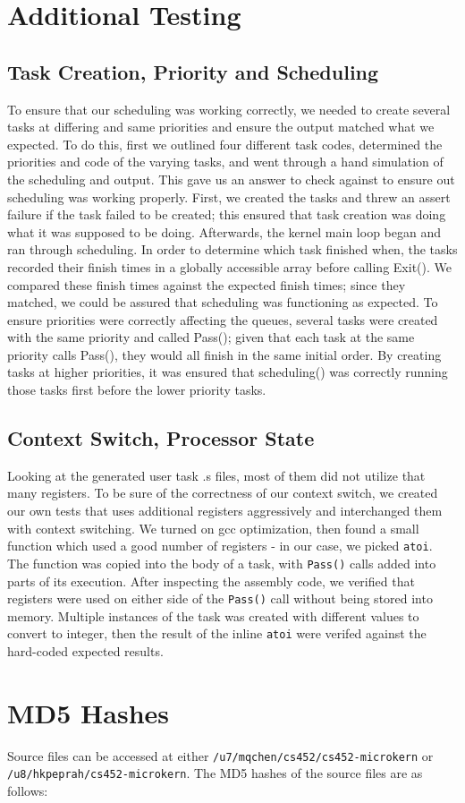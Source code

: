 \documentclass[12pt]{article}
\begin{document}
\section{Additional Testing}
\subsection{Task Creation, Priority and Scheduling}
To ensure that our scheduling was working correctly, we needed to create several tasks at differing and same priorities and ensure the output matched what we expected.  To do this, first we outlined four different task codes, determined the priorities and code of the varying tasks, and went through a hand simulation of the scheduling and output.  This gave us an answer to check against to ensure out scheduling was working properly.  First, we created the tasks and threw an assert failure if the task failed to be created; this ensured that task creation was doing what it was supposed to be doing.  Afterwards, the kernel main loop began and ran through scheduling.  In order to determine which task finished when, the tasks recorded their finish times in a globally accessible array before calling \textmd{Exit()}.  We compared these finish times against the expected finish times; since they matched, we could be assured that scheduling was functioning as expected.  To ensure priorities were correctly affecting the queues, several tasks were created with the same priority and called \textmd{Pass()}; given that each task at the same priority calls \textmd{Pass()}, they would all finish in the same initial order.  By creating tasks at higher priorities, it was ensured that \textmd{scheduling()} was correctly running those tasks first before the lower priority tasks.
\\[1\baselineskip]
\subsection{Context Switch, Processor State}
Looking at the generated user task .s files, most of them did not utilize that many registers. To be sure of the correctness of our context switch, we created our own tests that uses additional registers aggressively and interchanged them with context switching. We turned on gcc optimization, then found a small function which used a good number of registers - in our case, we picked \texttt{atoi}. The function was copied into the body of a task, with \texttt{Pass()} calls added into parts of its execution. After inspecting the assembly code, we verified that registers were used on either side of the \texttt{Pass()} call without being stored into memory. Multiple instances of the task was created with different values to convert to integer, then the result of the inline \texttt{atoi} were verifed against the hard-coded expected results.
\\[2\baselineskip]

\section{MD5 Hashes}
Source files can be accessed at either \texttt{/u7/mqchen/cs452/cs452-microkern} or \\ \texttt{/u8/hkpeprah/cs452-microkern}. The MD5 hashes of the source files are as follows:\\

\end{document}
